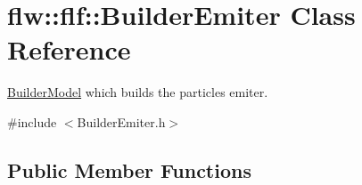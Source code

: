 \hypertarget{classflw_1_1flf_1_1BuilderEmiter}{}\section{flw\+:\+:flf\+:\+:Builder\+Emiter Class Reference}
\label{classflw_1_1flf_1_1BuilderEmiter}


\hyperlink{classflw_1_1flf_1_1BuilderModel}{Builder\+Model} which builds the particles emiter.  




{\ttfamily \#include $<$Builder\+Emiter.\+h$>$}

\subsection*{Public Member Functions}
